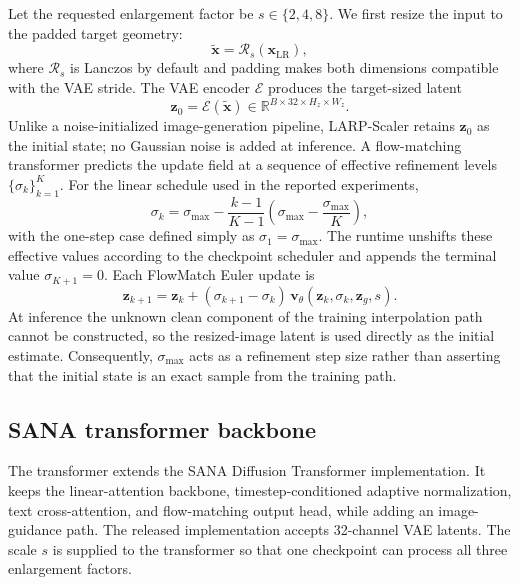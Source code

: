\documentclass[10pt]{article}
\newcommand{\method}{LARP-Scaler\xspace}
\newcommand{\R}{\mathbb{R}}
\begin{document}
Let the requested enlargement factor be $s\in\{2,4,8\}$. We first resize the
input to the padded target geometry:
\begin{equation}
  \widetilde{\bm{x}} =
  \mathcal{R}_{s}\!\left(\bm{x}_{\mathrm{LR}}\right),
\end{equation}
where $\mathcal{R}_{s}$ is Lanczos by default and padding makes both dimensions
compatible with the VAE stride. The VAE encoder $\mathcal{E}$ produces the
target-sized latent
\begin{equation}
  \bm{z}_{0} = \mathcal{E}(\widetilde{\bm{x}})\in
  \R^{B\times 32\times H_z\times W_z}.
\end{equation}
Unlike a noise-initialized image-generation pipeline, \method retains
$\bm{z}_{0}$ as the initial state; no Gaussian noise is added at inference.
A flow-matching transformer predicts the update field at a sequence of
effective refinement levels
$\{\sigma_k\}_{k=1}^{K}$. For the linear schedule used in the reported
experiments,
\begin{equation}
  \sigma_k =
  \sigma_{\max} -
  \frac{k-1}{K-1}
  \left(\sigma_{\max}-\frac{\sigma_{\max}}{K}\right),
\end{equation}
with the one-step case defined simply as $\sigma_1=\sigma_{\max}$. The runtime
unshifts these effective values according to the checkpoint scheduler and
appends the terminal value $\sigma_{K+1}=0$. Each FlowMatch Euler update is
\begin{equation}
  \bm{z}_{k+1}=\bm{z}_{k}
  +(\sigma_{k+1}-\sigma_k)\,
  \bm{v}_{\theta}(\bm{z}_{k},\sigma_k,\bm{z}_{g},s).
\end{equation}
At inference the unknown clean component of the training interpolation path
cannot be constructed, so the resized-image latent is used directly as the
initial estimate. Consequently, $\sigma_{\max}$ acts as a refinement step
size rather than asserting that the initial state is an exact sample from the
training path.

\subsection{SANA transformer backbone}

The transformer extends the SANA Diffusion Transformer implementation. It
keeps the linear-attention backbone, timestep-conditioned adaptive
normalization, text cross-attention, and flow-matching output head, while
adding an image-guidance path. The released implementation accepts 32-channel
VAE latents. The scale $s$ is supplied to the transformer so that one
checkpoint can process all three enlargement factors.
\end{document}
